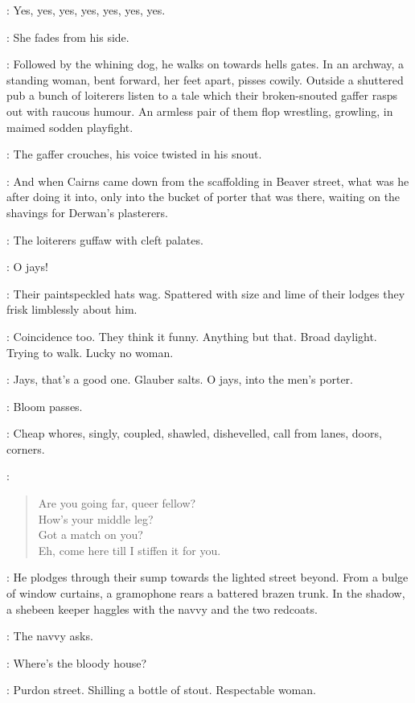 \MrsBreen:
Yes, yes, yes, yes, yes, yes, yes.

:
She fades from his side.

:
Followed by the whining dog, he walks on towards hells gates.
In an archway, a standing woman, bent forward, her feet apart, pisses cowily.
Outside a shuttered pub a bunch of loiterers
listen to a tale which their broken-snouted gaffer rasps out with raucous humour.
An armless pair of them flop wrestling, growling, in maimed sodden playfight.

:
The gaffer crouches, his voice twisted in his snout.

\Gaffer:
And when Cairns came down from the scaffolding in Beaver street,
what was he after doing it into,
only into the bucket of porter that was there,
waiting on the shavings for Derwan's plasterers.

:
The loiterers guffaw with cleft palates.

\Loiterers:
O jays!

:
Their paintspeckled hats wag.
Spattered with size and lime of their lodges
they frisk limblessly about him.

\Bloom:
Coincidence too.
They think it funny.
Anything but that.
Broad daylight.
Trying to walk.
Lucky no woman.

\Loiterers:
Jays, that's a good one.
Glauber salts.
O jays, into the men's porter.

:
Bloom passes.

:
Cheap whores, singly, coupled, shawled, dishevelled,
call from lanes, doors, corners.

\Whores:
\begin{verse}
%
    Are you going far, queer fellow?\\
    How's your middle leg?\\
    Got a match on you?\\
    Eh, come here till I stiffen it for you.
\end{verse}

:
He plodges through their sump towards the lighted street beyond.
From a bulge of window curtains, a gramophone rears a battered brazen trunk.
In the shadow, a shebeen keeper haggles with the navvy and the two redcoats.

:
The navvy asks.

\Navvy:
Where's the bloody house?

\ShebeenKeeper[1]:
Purdon street.
Shilling a bottle of stout.
Respectable woman.

